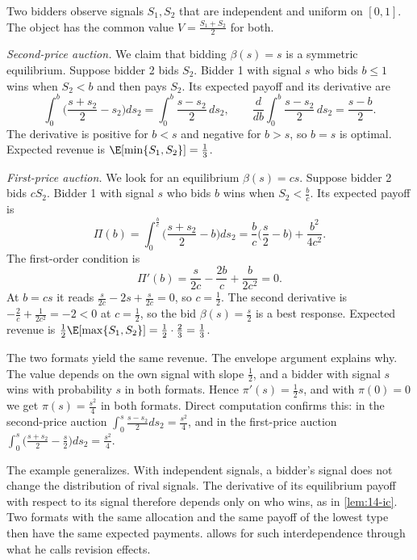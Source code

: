 \begin{example}\label{ex:14-iv-independent}
Two bidders observe signals $S_1,S_2$ that are independent and uniform on $[0,1]$. The object has the common value $V=\frac{S_1+S_2}{2}$ for both.

\emph{Second-price auction.} We claim that bidding $\beta(s)=s$ is a symmetric equilibrium. Suppose bidder 2 bids $S_2$. Bidder 1 with signal $s$ who bids $b\le 1$ wins when $S_2<b$ and then pays $S_2$. Its expected payoff and its derivative are
\[
\int_0^b\Big(\frac{s+s_2}{2}-s_2\Big)ds_2=\int_0^b\frac{s-s_2}{2}\,ds_2,\qquad \frac{d}{db}\int_0^b\frac{s-s_2}{2}\,ds_2=\frac{s-b}{2}.
\]
The derivative is positive for $b<s$ and negative for $b>s$, so $b=s$ is optimal. Expected revenue is $\E[\min\{S_1,S_2\}]=\frac13$.

\emph{First-price auction.} We look for an equilibrium $\beta(s)=cs$. Suppose bidder 2 bids $cS_2$. Bidder 1 with signal $s$ who bids $b$ wins when $S_2<\frac{b}{c}$. Its expected payoff is
\[
\Pi(b)=\int_0^{\frac{b}{c}}\Big(\frac{s+s_2}{2}-b\Big)ds_2=\frac{b}{c}\Big(\frac{s}{2}-b\Big)+\frac{b^2}{4c^2}.
\]
The first-order condition is
\[
\Pi'(b)=\frac{s}{2c}-\frac{2b}{c}+\frac{b}{2c^2}=0.
\]
At $b=cs$ it reads $\frac{s}{2c}-2s+\frac{s}{2c}=0$, so $c=\frac12$. The second derivative is $-\frac{2}{c}+\frac{1}{2c^2}=-2<0$ at $c=\frac12$, so the bid $\beta(s)=\frac{s}{2}$ is a best response. Expected revenue is $\frac12\E[\max\{S_1,S_2\}]=\frac12\cdot\frac23=\frac13$.

The two formats yield the same revenue. The envelope argument explains why. The value depends on the own signal with slope $\frac12$, and a bidder with signal $s$ wins with probability $s$ in both formats. Hence $\pi'(s)=\frac12 s$, and with $\pi(0)=0$ we get $\pi(s)=\frac{s^2}{4}$ in both formats. Direct computation confirms this: in the second-price auction $\int_0^s\frac{s-s_2}{2}ds_2=\frac{s^2}{4}$, and in the first-price auction $\int_0^s\big(\frac{s+s_2}{2}-\frac{s}{2}\big)ds_2=\frac{s^2}{4}$.
\end{example}

The example generalizes. With independent signals, a bidder's signal does not change the distribution of rival signals. The derivative of its equilibrium payoff with respect to its signal therefore depends only on who wins, as in \cref{lem:14-ic}. Two formats with the same allocation and the same payoff of the lowest type then have the same expected payments.  allows for such interdependence through what he calls revision effects.


